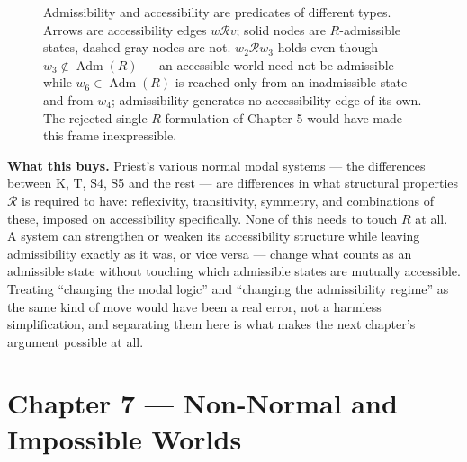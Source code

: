 \begin{figure}[htbp]
\centering
{}
\caption{Admissibility and accessibility are predicates of different
types. Arrows are accessibility edges $w \mathcal{R} v$; solid nodes are
$R$-admissible states, dashed gray nodes are not. $w_2 \mathcal{R} w_3$
holds even though $w_3 \notin \operatorname{Adm}(R)$ --- an accessible
world need not be admissible --- while $w_6 \in \operatorname{Adm}(R)$ is
reached only from an inadmissible state and from $w_4$; admissibility
generates no accessibility edge of its own. The rejected single-$R$
formulation of Chapter 5 would have made this frame inexpressible.}
\label{fig:adm-vs-acc}
\end{figure}

\textbf{What this buys.} Priest's various normal modal systems --- the
differences between K, T, S4, S5 and the rest --- are differences in what
structural properties \(\mathcal{R}\) is required to have: reflexivity,
transitivity, symmetry, and combinations of these, imposed on
accessibility specifically. None of this needs to touch \(R\) at all. A
system can strengthen or weaken its accessibility structure while
leaving admissibility exactly as it was, or vice versa --- change what
counts as an admissible state without touching which admissible states
are mutually accessible. Treating ``changing the modal logic'' and
``changing the admissibility regime'' as the same kind of move would have
been a real error, not a harmless simplification, and separating them
here is what makes the next chapter's argument possible at all.

\hypertarget{chapter-7-non-normal-and-impossible-worlds}{%
\chapter*{Chapter 7 --- Non-Normal and Impossible Worlds}
\label{chapter-7-non-normal-and-impossible-worlds}}


